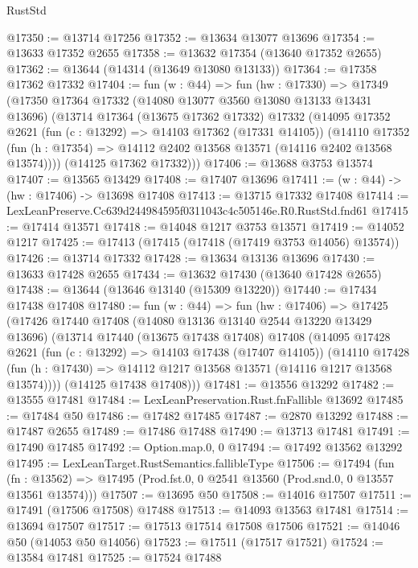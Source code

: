 \begin{lexlean}{RustStd}
\begin{coremodule}
@17350 := @13714 @17256
@17352 := @13634 @13077 @13696
@17354 := @13633 @17352 @2655
@17358 := @13632 @17354 (@13640 @17352 @2655)
@17362 := @13644 (@14314 (@13649 @13080 @13133))
@17364 := @17358 @17362 @17332
@17404 := fun (w : @44) =>
  fun (hw : @17330) =>
  @17349
    (@17350
      @17364
      @17332
      (@14080 @13077 @3560 @13080 @13133 @13431 @13696)
      (@13714
        @17364
        (@13675 @17362 @17332)
        @17332
        (@14095
          @17352
          @2621
          (fun (c : @13292) => @14103 @17362 (@17331 @14105))
          (@14110
            @17352
            (fun (h : @17354) => @14112 @2402 @13568 @13571 (@14116 @2402 @13568 @13574))))
        (@14125 @17362 @17332)))
@17406 := @13688 @3753 @13574
@17407 := @13565 @13429
@17408 := @17407 @13696
@17411 := (w : @44) -> (hw : @17406) -> @13698 @17408
@17413 := @13715 @17332 @17408
@17414 := LexLeanPreserve.Cc639d244984595f0311043c4c505146e.R0.RustStd.fnd61
@17415 := @17414 @13571
@17418 := @14048 @1217 @3753 @13571
@17419 := @14052 @1217
@17425 := @17413 (@17415 (@17418 (@17419 @3753 @14056) @13574))
@17426 := @13714 @17332
@17428 := @13634 @13136 @13696
@17430 := @13633 @17428 @2655
@17434 := @13632 @17430 (@13640 @17428 @2655)
@17438 := @13644 (@13646 @13140 (@15309 @13220))
@17440 := @17434 @17438 @17408
@17480 := fun (w : @44) =>
  fun (hw : @17406) =>
  @17425
    (@17426
      @17440
      @17408
      (@14080 @13136 @13140 @2544 @13220 @13429 @13696)
      (@13714
        @17440
        (@13675 @17438 @17408)
        @17408
        (@14095
          @17428
          @2621
          (fun (c : @13292) => @14103 @17438 (@17407 @14105))
          (@14110
            @17428
            (fun (h : @17430) => @14112 @1217 @13568 @13571 (@14116 @1217 @13568 @13574))))
        (@14125 @17438 @17408)))
@17481 := @13556 @13292
@17482 := @13555 @17481
@17484 := LexLeanPreservation.Rust.fnFallible @13692
@17485 := @17484 @50
@17486 := @17482 @17485
@17487 := @2870 @13292
@17488 := @17487 @2655
@17489 := @17486 @17488
@17490 := @13713 @17481
@17491 := @17490 @17485
@17492 := Option.map.{0, 0}
@17494 := @17492 @13562 @13292
@17495 := LexLeanTarget.RustSemantics.fallibleType
@17506 := @17494
    (fun (fn : @13562) =>
    @17495 (Prod.fst.{0, 0} @2541 @13560 (Prod.snd.{0, 0} @13557 @13561 @13574)))
@17507 := @13695 @50
@17508 := @14016 @17507
@17511 := @17491 (@17506 @17508) @17488
@17513 := @14093 @13563 @17481
@17514 := @13694 @17507
@17517 := @17513 @17514 @17508 @17506
@17521 := @14046 @50 (@14053 @50 @14056)
@17523 := @17511 (@17517 @17521)
@17524 := @13584 @17481
@17525 := @17524 @17488

\end{coremodule}
\end{lexlean}
